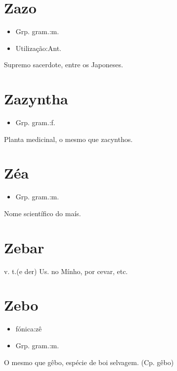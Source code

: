 \section{Zazo}
\begin{itemize}
\item {Grp. gram.:m.}
\end{itemize}
\begin{itemize}
\item {Utilização:Ant.}
\end{itemize}
Supremo sacerdote, entre os Japoneses.
\section{Zazyntha}
\begin{itemize}
\item {Grp. gram.:f.}
\end{itemize}
Planta medicinal, o mesmo que \textunderscore zacynthos\textunderscore .
\section{Zéa}
\begin{itemize}
\item {Grp. gram.:m.}
\end{itemize}
Nome scientífico do maís.
\section{Zebar}
\textunderscore v. t.\textunderscore  (e der)
Us. no Mínho, por \textunderscore cevar\textunderscore , etc.
\section{Zebo}
\begin{itemize}
\item {fónica:zê}
\end{itemize}
\begin{itemize}
\item {Grp. gram.:m.}
\end{itemize}
O mesmo que \textunderscore gêbo\textunderscore , espécie de boi selvagem.
(Cp. \textunderscore gêbo\textunderscore )
